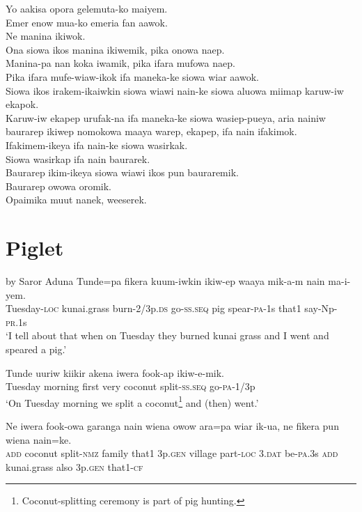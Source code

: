 Yo aakisa opora gelemuta-ko maiyem. \\
Emer enow mua-ko emeria fan aawok. \\
Ne manina ikiwok. \\
Ona siowa ikos manina ikiwemik, pika onowa naep. \\
Manina-pa nan koka iwamik, pika ifara mufowa naep. \\
Pika ifara mufe-wiaw-ikok ifa maneka-ke siowa wiar aawok. \\
Siowa ikos irakem-ikaiwkin siowa wiawi nain-ke siowa aluowa miimap karuw-iw ekapok. \\
Karuw-iw ekapep urufak-na ifa maneka-ke siowa wasiep-pueya,  aria nainiw baurarep ikiwep nomokowa maaya warep, ekapep, ifa nain ifakimok. \\
Ifakimem-ikeya ifa nain-ke siowa wasirkak. \\
Siowa wasirkap ifa nain baurarek. \\
Baurarep ikim-ikeya siowa wiawi ikos pun bauraremik. \\
Baurarep owowa oromik. \\
Opaimika muut nanek, weeserek. \\

\setcounter{equation}{0}
\section{ Piglet} 

 by Saror Aduna
\ea
\gll  Tunde=pa  fikera  kuum-iwkin  ikiw-ep  waaya      mik-a-m  nain  ma-i-yem. \\
Tuesday-\textsc{loc}  kunai.grass  burn-2/3p.\textsc{ds}  go-\textsc{ss.seq}  pig  spear-\textsc{pa}-1s  that1  say-Np-\textsc{pr}.1s \\


\glt ‘I tell about that when on Tuesday they burned kunai grass and I went and speared a pig.’ \\
\z


\ea
\gll  Tunde  uuriw  kiikir  akena  iwera  fook-ap  ikiw-e-mik. \\
Tuesday  morning  first  very  coconut  split-\textsc{ss.seq}  go-\textsc{pa}-1/3p \\
\glt ‘On Tuesday morning we split a coconut\footnote{ Coconut-splitting ceremony is part of pig hunting.} and (then) went.’ \\
\z


\ea
\gll  Ne  iwera  fook-owa  garanga  nain  wiena  owow  ara=pa      wiar  ik-ua,  ne  fikera  pun  wiena  nain=ke. \\
\textsc{add}  coconut  split-\textsc{nmz}  family  that1  3p.\textsc{gen}  village  part-\textsc{loc}  3.\textsc{dat}  be-\textsc{pa}.3s  \textsc{add}  kunai.grass  also  3p.\textsc{gen}  that1-\textsc{cf} \\


